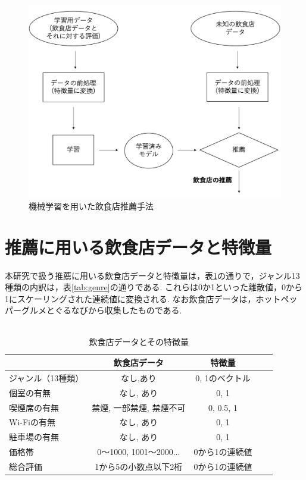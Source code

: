 \documentclass[12pt,a4j]{jreport}
\begin{document}
\begin{figure}[htbp]
  \begin{center}
    \includegraphics[width=13cm]{fig1.png}
    \caption{機械学習を用いた飲食店推薦手法}
    \label{fig1}
  \end{center}
\end{figure}

\section{推薦に用いる飲食店データと特徴量}
本研究で扱う推薦に用いる飲食店データと特徴量は，表\ref{tab:feature_values}の通りで，ジャンル13種類の内訳は，表\ref{tab:genre}の通りである.
これらは0か1といった離散値，0から1にスケーリングされた連続値に変換される.
なお飲食店データは，ホットペッパーグルメとぐるなびから収集したものである.\\\\

\begin{table}[htbp]
  \begin{center}
    \begin{tabular}{|l|c|c|c|c|}\hline
       & \textbf{飲食店データ} & \textbf{特徴量} \\ \hline
      ジャンル（13種類） & なし,あり & 0, 1のベクトル \\ \hline
      個室の有無 & なし, あり & 0, 1 \\ \hline
      喫煙席の有無 & 禁煙, 一部禁煙, 禁煙不可 & 0, 0.5, 1 \\ \hline
      Wi-Fiの有無 & なし, あり & 0, 1 \\ \hline
      駐車場の有無 & なし, あり & 0, 1 \\ \hline
      価格帯 & 0〜1000, 1001〜2000... & 0から1の連続値 \\ \hline
      総合評価 & 1から5の小数点以下2桁 & 0から1の連続値 \\ \hline
    \end{tabular}
  \end{center}
  \caption{飲食店データとその特徴量}
  \label{tab:feature_values}
\end{table}
\end{document}
